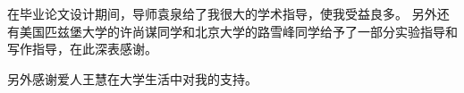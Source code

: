 
\begin{acknowledgements}

在毕业论文设计期间，导师袁泉给了我很大的学术指导，使我受益良多。
另外还有美国匹兹堡大学的许尚谋同学和北京大学的路雪峰同学给予了一部分实验指导和写作指导，在此深表感谢。

另外感谢爱人王慧在大学生活中对我的支持。

\end{acknowledgements}
